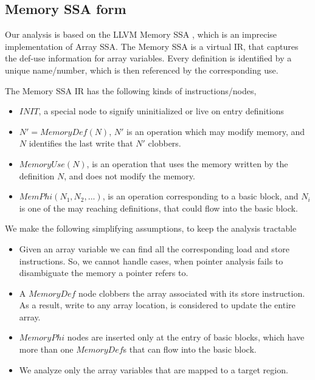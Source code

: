 \subsection{Memory SSA form} Our analysis is based on the LLVM 
 Memory SSA \cite{llvm-memoryssa-url} \cite{Novillo_memoryssa}, 
 which is an imprecise 
implementation of Array SSA\cite{Knobe:1998:ASF:268946.268956}.
The Memory SSA is a virtual IR, that captures the def-use 
information for array variables. Every definition is 
identified by a unique name/number, which is then referenced 
by the corresponding use.

The Memory SSA IR has the following kinds of instructions/nodes, 
\begin{itemize}
 \item $INIT$, a special node to signify uninitialized or live on 
 entry definitions
 \item $N' = MemoryDef(N)$, $N'$ is an operation which may modify memory, 
 and $N$ identifies the last write that $N'$  clobbers.
 \item $MemoryUse(N)$, is an operation that uses the memory written 
 by the definition $N$, and does not modify the memory. 
 \item $MemPhi(N_1,N_2,...)$, is an operation corresponding to a
 basic block, and $N_i$ is one of the may reaching definitions, 
 that could flow into the basic block.
\end{itemize}

We make the following simplifying assumptions, to keep the analysis
tractable
\begin{itemize}
 \item Given an array variable we can find all the  corresponding
 load and store instructions. So, we cannot handle cases, when pointer
 analysis fails to disambiguate the memory a pointer refers to.
 \item A $MemoryDef$ node clobbers the array associated 
 with its store instruction. As a result, write to any array location, 
 is considered to update the entire array.
 \item $MemoryPhi$ nodes are inserted only at the entry 
 of basic blocks, which have more than one $MemoryDef$s that can 
 flow into the basic block.
 \item We analyze only the array variables that 
 are mapped to a target region. 
\end{itemize}

